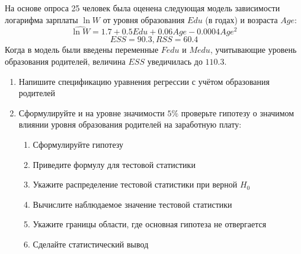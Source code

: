 \documentclass[pdftex,11pt,openany]{book}\usepackage[]{graphicx}\usepackage[]{color}
\begin{document}
\begin{solution}
\end{solution}




\begin{problem}
 На основе опроса 25 человек была оценена следующая модель зависимости логарифма зарплаты $\ln W$ от уровня образования $Edu$ (в годах) и возраста $Age$: 
\[
\widehat{\ln W} = 1.7 + 0.5Edu + 0.06Age - 0.0004Age^2
\]
\[
ESS = 90.3, RSS = 60.4
\]
Когда в модель были введены переменные $Fedu$ и $Medu$, учитывающие уровень образования родителей, величина $ESS$ уведичилась до $110.3.$
\begin{enumerate}
\item Напишите спецификацию уравнения регрессии с учётом образования родителей
\item Сформулируйте и на уровне значимости $5\%$ проверьте гипотезу о значимом влиянии уровня образования родителей на заработную плату:
\begin{enumerate}
\item Сформулируйте гипотезу
\item Приведите формулу для тестовой статистики 
\item Укажите распределение тестовой статистики при верной $H_0$
\item Вычислите наблюдаемое значение тестовой статистики
\item Укажите границы области, где основная гипотеза не отвергается
\item Сделайте статистический вывод
\end{enumerate}
\end{enumerate}
\end{problem}
\end{document}
